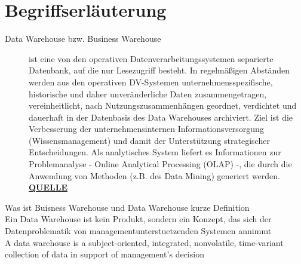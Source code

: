 
\chapter{Begriffserläuterung}
\begin{description}
	\item [Data Warehouse bzw. Business Warehouse] ist eine von den operativen Datenverarbeitungssystemen separierte Datenbank, auf die nur Lesezugriff besteht. In regelmäßigen Abständen werden aus den operativen DV-Systemen unternehmensspezifische, historische und daher unveränderliche Daten zusammengetragen, vereinheitlicht, nach Nutzungszusammenhängen geordnet, verdichtet und dauerhaft in der Datenbasis des Data Warehouses archiviert. Ziel ist die Verbesserung der unternehmensinternen Informationsversorgung (Wissensmanagement) und damit der Unterstützung strategischer Entscheidungen. Als analytisches System liefert es Informationen zur Problemanalyse - Online Analytical Processing (OLAP) -, die durch die Anwendung von Methoden (z.B. des Data Mining) generiert werden.  \href{http://wirtschaftslexikon.gabler.de/Definition/data-warehouse.html?referenceKeywordName=Business+Warehouse}{\textbf{QUELLE}}
\end{description}



Was ist Buisness Warehouse und Data Warehouse kurze Definition \\
Ein Data Warehouse ist kein Produkt, sondern ein Konzept, das sich der Datenproblematik von managementunterstuetzenden Systemen annimmt\\
A data warehouse is a subject-oriented, integrated, nonvolatile, time-variant collection of data in support of management’s decision \\

